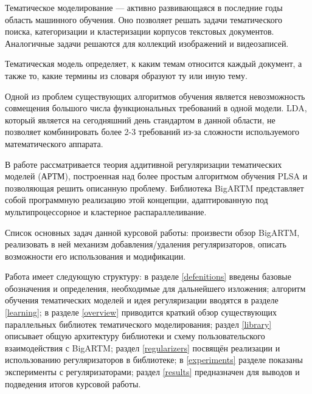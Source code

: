 
Тематическое моделирование --- активно развивающаяся в последние годы область машинного обучения. Оно позволяет решать задачи тематического поиска, категоризации и кластеризации корпусов текстовых документов. Аналогичные задачи решаются для коллекций изображений и видеозаписей.

Тематическая модель определяет, к каким темам относится каждый документ, а также то, какие термины из словаря образуют ту или иную тему.

Одной из проблем существующих алгоритмов обучения является невозможность совмещения большого числа функциональных требований в одной модели. LDA, который является на сегодняшний день стандартом в данной области, не позволяет комбинировать более 2-3 требований из-за сложности используемого математического аппарата.

В работе \cite{voron2013ptm} рассматривается теория аддитивной регуляризации тематических моделей (АРТМ), построенная над более простым алгоритмом обучения PLSA и позволяющая решить описанную проблему. Библиотека BigARTM представляет собой программную реализацию этой концепции, адаптированную под мультипроцессорное и кластерное распараллеливание.

Список основных задач данной курсовой работы: произвести обзор BigARTM, реализовать в ней  механизм добавления/удаления регуляризаторов, описать возможности его использования и модификации. 

Работа имеет следующую структуру: в разделе \ref{defenitions} введены базовые обозначения и определения, необходимые для дальнейшего изложения; алгоритм обучения тематических моделей и идея регуляризации вводятся в разделе \ref{learning}; в разделе \ref{overview} приводится краткий обзор существующих параллельных библиотек тематического моделирования; раздел \ref{library} описывает общую архитектуру библиотеки и схему пользовательского взаимодействия с BigARTM; раздел \ref{regularizers} посвящён реализации и использованию регуляризаторов в библиотеке; в \ref{experiments} разделе показаны эксперименты с регуляризаторами; раздел \ref{results} предназначен для выводов и подведения итогов курсовой работы.